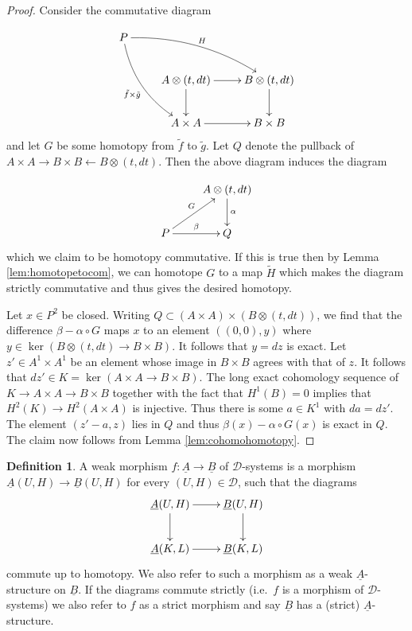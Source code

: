 \documentclass[12pt,a4paper]{article}
\theoremstyle{definition}
\newtheorem{defn}[thm]{Definition}
\begin{document}
\begin{proof}
Consider the commutative diagram

\[\xymatrix{P\ar@/_1.0pc/[ddr]_{\tilde{f}\times\tilde{g}}\ar@/^1.0pc/[rrd]^H & &\\
 & A\otimes (t,dt)\ar[d]\ar[r] & B\otimes (t,dt)\ar[d]\\
 & A\times A\ar[r] & B\times B
}\]
and let $G$ be some homotopy from $\tilde{f}$ to $\tilde{g}$. Let $Q$ denote the pullback of $A\times A\rightarrow B\times B\leftarrow B\otimes (t,dt)$. Then the above diagram induces the diagram

\[\xymatrix{
 & A\otimes (t,dt)\ar[d]^\alpha\\
 P\ar[ru]^G\ar[r]^\beta & Q
}\]
which we claim to be homotopy commutative. If this is true then by Lemma \ref{lem:homotopetocom}, we can homotope $G$ to a map $\tilde{H}$ which makes the diagram strictly commutative and thus gives the desired homotopy.

Let $x\in P^2$ be closed. Writing $Q\subset (A\times A)\times (B\otimes (t,dt))$, we find that the difference $\beta-\alpha\circ G$ maps $x$ to an element $((0,0),y)$ where $y\in \ker(B\otimes (t,dt)\rightarrow B\times B)$. It follows that $y=dz$ is exact. Let $z'\in A^1\times A^1$ be an element whose image in $B\times B$ agrees with that of $z$. It follows that $dz'\in K=\ker(A\times A\rightarrow B\times B)$. The long exact cohomology sequence of $K\rightarrow A\times A\rightarrow B\times B$ together with the fact that $H^1(B)=0$ implies that $H^2(K)\rightarrow H^2(A\times A)$ is injective. Thus there is some $a\in K^1$ with $da=dz'$. The element $(z'-a,z)$ lies in $Q$ and thus $\beta(x)-\alpha\circ G(x)$ is exact in $Q$. The claim now follows from Lemma \ref{lem:cohomohomotopy}.
\end{proof}

\begin{defn}
A weak morphism $f\colon \underline{A}\rightarrow \underline{B}$ of $\mathcal{D}$-systems is a morphism $\underline{A}(U,H)\rightarrow \underline{B}(U,H)$ for every $(U,H)\in \mathcal{D}$, such that the diagrams
\[\xymatrix{
\underline{A}(U,H)\ar[r]\ar[d] & \underline{B}(U,H)\ar[d]\\ \underline{A}(K,L)\ar[r]& \underline{B}(K,L)}\]
commute up to homotopy. We also refer to such a morphism as a weak $\underline{A}$-structure on $\underline{B}$. If the diagrams commute strictly (i.e.\ $f$ is a morphism of $\mathcal{D}$-systems) we also refer to $f$ as a strict morphism and say $\underline{B}$ has a (strict) $\underline{A}$-structure.
\end{defn}
\end{document}
